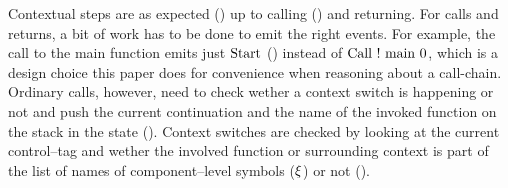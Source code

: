 \documentclass[utf8,acmsmall,review,screen,dvipsnames]{acmart}
\begin{document}
\begin{center}
\end{center}

Contextual steps are as expected () up to calling () and returning.
For calls and returns, a bit of work has to be done to emit the right events.
For example, the call to the main function emits just $\text{Start}$ () instead of $\text{Call}\  ! \ \text{main}\ 0$, which is a design choice this paper does for convenience when reasoning about a call-chain.
Ordinary calls, however, need to check wether a context switch is happening or not and push the current continuation and the name of the invoked function on the stack in the state ().
Context switches are checked by looking at the current control--tag and wether the involved function or surrounding context is part of the list of names of component--level symbols ($\xi$) or not ().
\end{document}
